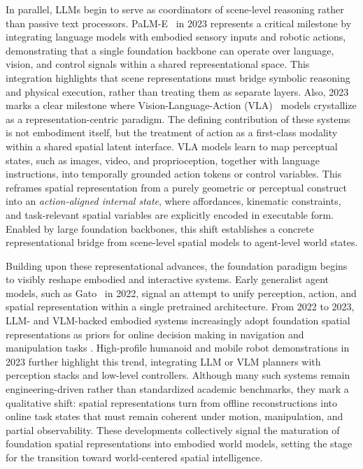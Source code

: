 In parallel, LLMs begin to serve as coordinators of scene-level reasoning rather than passive text processors.
PaLM-E~\cite{driess2023palm} in 2023 represents a critical milestone by integrating language models with embodied sensory inputs and robotic actions, demonstrating that a single foundation backbone can operate over language, vision, and control signals within a shared representational space.
This integration highlights that scene representations must bridge symbolic reasoning and physical execution, rather than treating them as separate layers.
Also, 2023 marks a clear milestone where Vision-Language-Action (VLA)~\cite{zitkovich2023rt2} models crystallize as a representation-centric paradigm.
The defining contribution of these systems is not embodiment itself, but the treatment of action as a first-class modality within a shared spatial latent interface.
VLA models learn to map perceptual states, such as images, video, and proprioception, together with language instructions, into temporally grounded action tokens or control variables.
This reframes spatial representation from a purely geometric or perceptual construct into an \emph{action-aligned internal state}, where affordances, kinematic constraints, and task-relevant spatial variables are explicitly encoded in executable form.
Enabled by large foundation backbones, this shift establishes a concrete representational bridge from scene-level spatial models to agent-level world states.





Building upon these representational advances, the foundation paradigm begins to visibly reshape embodied and interactive systems.
Early generalist agent models, such as Gato~\cite{reed2022generalist} in 2022, signal an attempt to unify perception, action, and spatial representation within a single pretrained architecture.
From 2022 to 2023, LLM- and VLM-backed embodied systems increasingly adopt foundation spatial representations as priors for online decision making in navigation and manipulation tasks \cite{driess2023palm}.
High-profile humanoid and mobile robot demonstrations in 2023 further highlight this trend, integrating LLM or VLM planners with perception stacks and low-level controllers.
Although many such systems remain engineering-driven rather than standardized academic benchmarks, they mark a qualitative shift: spatial representations turn from offline reconstructions into online task states that must remain coherent under motion, manipulation, and partial observability.
These developments collectively signal the maturation of foundation spatial representations into embodied world models, setting the stage for the transition toward world-centered spatial intelligence.




